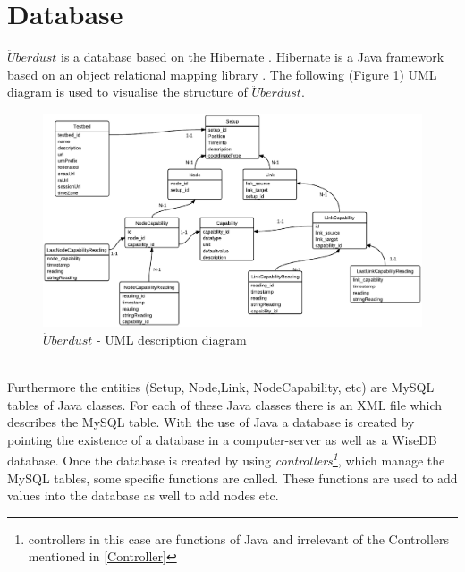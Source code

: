 \documentclass[12pt,a4paper,draft]{report}
\begin{document}
\section{Database}
%
$\ddot{U}berdust$ is a database based on the Hibernate \cite{website:hibernate}. Hibernate is a Java framework based on an object relational mapping library \cite{website:hibernate-wiki}. The following (Figure \ref{uberdust-uml}) UML diagram is used to visualise the structure of $\ddot{U}berdust$.
%
\begin{figure}[H]
\centering
\includegraphics*[scale=0.6]{wisedb2}
\caption{$\ddot{U}berdust$ - UML description diagram}
\label{uberdust-uml}
\end{figure}
\ \\
Furthermore the entities (Setup, Node,Link, NodeCapability, etc) are MySQL tables of Java classes.
For each of these Java classes there is an XML file which describes the MySQL table.
With the use of Java a database is created by pointing the existence of a database in a computer-server as well as a WiseDB database. %
Once the database is created by using \textit{controllers\footnote{controllers in this case are functions of Java and irrelevant of the Controllers mentioned in \ref{Controller}}}, which manage the MySQL tables, some specific functions are called. These functions are used to add values into the database as well to add nodes etc. 
%
\newpage
%
\end{document}

